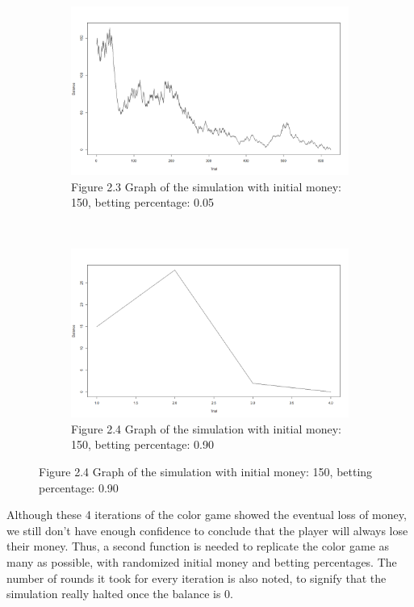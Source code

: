 \documentclass[12pt,letterpaper]{article}
\begin{document}
\begin{enumerate}[label=\Alph*]
\begin{figure}[H]
	\begin{subfigure}[H]{0.4\textwidth}	
		\includegraphics[width=\textwidth]{150_0.05.png}
		\caption*{\footnotesize Figure 2.3 Graph of the simulation with initial money: 150, betting percentage: 0.05}
	\end{subfigure}~~~
	\begin{subfigure}[H]{0.4\textwidth}	
		\includegraphics[width=\textwidth]{150_0.9.png}
		\caption*{\footnotesize Figure 2.4 Graph of the simulation with initial money: 150, betting percentage: 0.90}
	\end{subfigure}
\end{figure}


Although these 4 iterations of the color game showed the eventual loss of money, we still don't have enough confidence to conclude that the player will always lose their money. Thus, a second function is needed to replicate the color game as many as possible, with randomized initial money and betting percentages. The number of rounds it took for every iteration is also noted, to signify that the simulation really halted once the balance is 0.



\end{enumerate}
\end{document}
